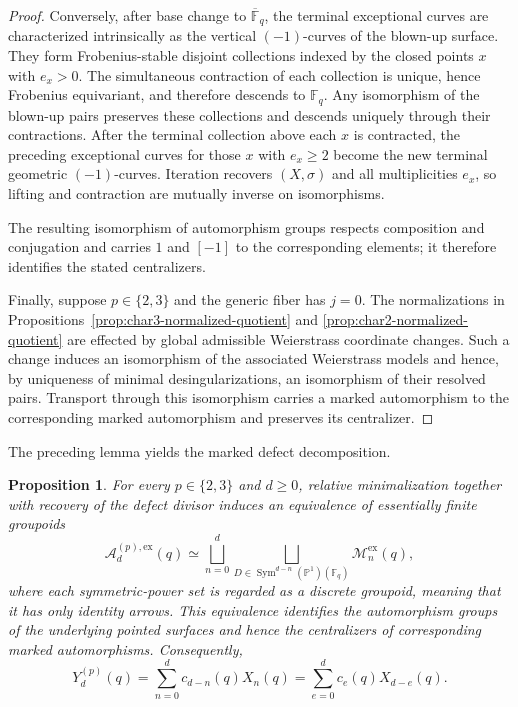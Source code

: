 \documentclass[a4paper,12pt]{amsart}
\newtheorem{prop}[thm]{Proposition}
\theoremstyle{definition}
\newcommand{\cM}{\mathcal{M}}
\newcommand{\Fb}{\mathbb{F}}
\newcommand{\Ac}{\mathcal{A}}
\newcommand{\Pb}{\mathbb{P}}
\newcommand{\Sym}{\operatorname{Sym}}
\begin{document}
\begin{proof}
Conversely, after base change to $\overline{\Fb}_q$, the terminal exceptional curves are characterized intrinsically as the vertical $(-1)$-curves of the blown-up surface.  They form Frobenius-stable disjoint collections indexed by the closed points $x$ with $e_x>0$.  The simultaneous contraction of each collection is unique, hence Frobenius equivariant, and therefore descends to $\Fb_q$.  Any isomorphism of the blown-up pairs preserves these collections and descends uniquely through their contractions.  After the terminal collection above each $x$ is contracted, the preceding exceptional curves for those $x$ with $e_x\geq2$ become the new terminal geometric $(-1)$-curves.  Iteration recovers $(X,\sigma)$ and all multiplicities $e_x$, so lifting and contraction are mutually inverse on isomorphisms.

The resulting isomorphism of automorphism groups respects composition and conjugation and carries $1$ and $[-1]$ to the corresponding elements; it therefore identifies the stated centralizers.

Finally, suppose $p\in\{2,3\}$ and the generic fiber has $j=0$.  The normalizations in Propositions~\ref{prop:char3-normalized-quotient} and \ref{prop:char2-normalized-quotient} are effected by global admissible Weierstrass coordinate changes.  Such a change induces an isomorphism of the associated Weierstrass models and hence, by uniqueness of minimal desingularizations, an isomorphism of their resolved pairs.  Transport through this isomorphism carries a marked automorphism to the corresponding marked automorphism and preserves its centralizer.
\end{proof}

The preceding lemma yields the marked defect decomposition.

\begin{prop}\label{prop:marked-defect}
For every $p\in\{2,3\}$ and $d\geq0$, relative minimalization together with recovery of the defect divisor induces an equivalence of essentially finite groupoids
\begin{equation}\label{eq:defect-equivalence}
\Ac_d^{(p),\mathrm{ex}}(q)
\simeq
\bigsqcup_{n=0}^{d}
\bigsqcup_{D\in\Sym^{d-n}(\Pb^1)(\Fb_q)}
\cM_n^{\mathrm{ex}}(q),
\end{equation}
where each symmetric-power set is regarded as a discrete groupoid, meaning that it has only identity arrows.  This equivalence identifies the automorphism groups of the underlying pointed surfaces and hence the centralizers of corresponding marked automorphisms.  Consequently,
\begin{equation}\label{eq:defect-recursion}
Y_d^{(p)}(q)
=
\sum_{n=0}^{d}c_{d-n}(q)X_n(q)
=
\sum_{e=0}^{d}c_e(q)X_{d-e}(q).
\end{equation}
\end{prop}
\end{document}
